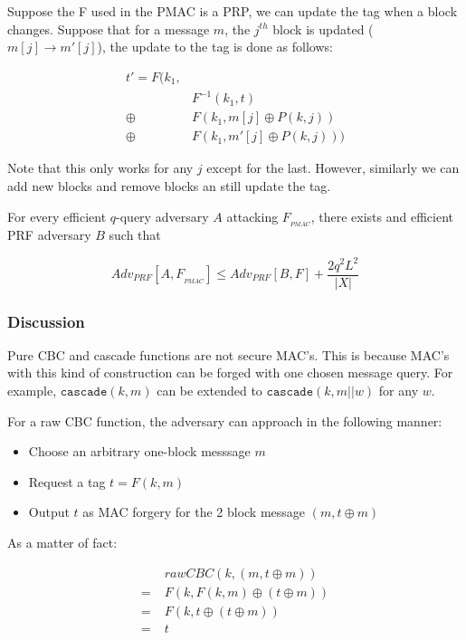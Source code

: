 \documentclass{article}
\begin{document}
\begin{multicols}{2}
Suppose the F used in the PMAC is a PRP, we can update the tag when a block changes. Suppose that for a message $m$, the $j^{th}$ block is updated ($m[j] \rightarrow m'[j]$), the update to the tag is done as follows:

\[
\begin{aligned}
    t' = F(k_1, &\\
    & F^{-1}(k_1,t) \\
    \oplus & F(k_1,m[j] \oplus P(k,j)) \\
    \oplus & F(k_1,m'[j] \oplus P(k,j)))
\end{aligned}
\]

Note that this only works for any $j$ except for the last. However, similarly we can add new blocks and remove blocks an still update the tag.

For every efficient $q$-query adversary $A$ attacking $F_{_{PMAC}}$, there exists and efficient PRF adversary $B$ such that

$$
Adv_{PRF}[A,F_{_{PMAC}}] \leq Adv_{PRF}[B, F] + \frac{2q^2L^2}{|X|}
$$


\subsubsection{Discussion}

Pure CBC and cascade functions are not secure MAC's. This is because MAC's with this kind of construction can be forged with one chosen message query. For example, $\mathtt{cascade}(k,m)$ can be extended to $\mathtt{cascade}(k,m||w)$ for any $w$.

For a raw CBC function, the adversary can approach in the following manner:

\begin{itemize}
    \item Choose an arbitrary one-block messsage $m$
    \item Request a tag $t = F(k,m)$
    \item Output $t$ as MAC forgery for the 2 block message $(m, t \oplus m)$
\end{itemize}

As a matter of fact:

\[
\begin{aligned}
     &\;rawCBC(k,(m,t \oplus m))\\
    =&\;F(k, F(k,m) \oplus (t \oplus m)) \\
    =&\;F(k,t \oplus (t \oplus m)) \\
    =&\;t
\end{aligned}    
\]


\end{multicols}
\end{document}
